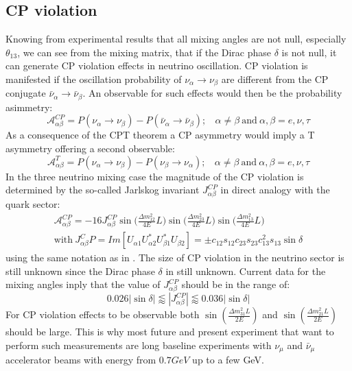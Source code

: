 \documentclass[12pt,a4paper,openright,twoside]{report}
\begin{document}
\subsection{CP violation}
Knowing from experimental results that all mixing angles are not null, especially $\theta_{13}$, we can see from the mixing matrix, that if the Dirac phase $\delta$ is not null, it can generate CP violation effects in neutrino oscillation. CP violation is manifested if the oscillation probability of $\nu_\alpha \rightarrow \nu_\beta$ are different from the CP conjugate $\bar{\nu}_\alpha \rightarrow \bar{\nu}_\beta$. An observable for such effects would then be the probability asimmetry:
\begin{equation}
\mathcal{A}_{\alpha\beta}^{CP}=P(\nu_\alpha \rightarrow \nu_\beta) - P(\bar{\nu}_\alpha \rightarrow \bar{\nu}_\beta); \ \ \ \ \alpha\neq\beta \ \text{and} \ \alpha,\beta=e,\nu,\tau
\end{equation}
As a consequence of the CPT theorem a CP asymmetry would imply a T asymmetry offering a second observable:
\begin{equation}
\mathcal{A}_{\alpha\beta}^{T}=P(\nu_\alpha \rightarrow \nu_\beta) - P(\nu_\beta \rightarrow \nu_\alpha); \ \ \ \ \alpha\neq\beta \ \text{and} \ \alpha,\beta=e,\nu,\tau
\end{equation}
In the three neutrino mixing case the magnitude of the CP violation is determined by the so-called Jarlskog invariant $J^{CP}_{\alpha\beta}$ in direct analogy with the quark sector:
\begin{equation}
\begin{split}
\mathcal{A}_{\alpha\beta}^{CP}=-16J_{\alpha\beta}^{CP}\sin\bigg(\frac{\Delta m_{12}^2}{4E}L\bigg) \sin\bigg(\frac{\Delta m_{23}^2}{4E}L\bigg) \sin\bigg(\frac{\Delta m_{13}^2}{4E}L\bigg) \\[10pt]
\text{with} \ J_{\alpha\beta}^CP= Im[U_{\alpha1}U_{\alpha2}^*U_{\beta1}^*U_{\beta2}]=\pm c_{12}s_{12}c_{23}s_{23}c_{13}^2s_{13}\sin\delta
\end{split}
\end{equation}
using the same notation as in . The size of CP violation in the neutrino sector is still unknown since the Dirac phase $\delta$ in still unknown. Current data for the mixing angles inply that the value of $J^{CP}_{\alpha\beta}$ should be in the range of:
\begin{equation}
0.026|\sin \delta|\lessapprox |J_{\alpha\beta}^{CP}| \lessapprox 0.036 |\sin \delta|
\end{equation} 
For CP violation effects to be observable both $\sin(\frac{\Delta m_{31}^2L}{2E})$ and $\sin(\frac{\Delta m_{21}^2L}{2E})$ should be large. This is why most future and present experiment that want to perform such measurements are long baseline experiments with $\nu_\mu$ and $\bar{\nu}_\mu$ accelerator beams with energy from $0.7 GeV$ up to a few GeV. 
\end{document}
